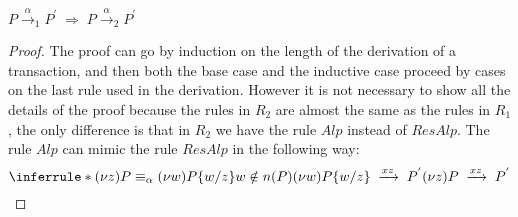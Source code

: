 

\begin{theorem}
  $P\xrightarrow{\alpha}_{1}P^{'}\; \Rightarrow\; P\xrightarrow{\alpha}_{2}P^{'}$
  \begin{proof}
    The proof can go by induction on the length of the derivation of a transaction, and then both the base case and the inductive case proceed by cases on the last rule used in the derivation. However it is not necessary to show all the details of the proof because the rules in $R_{2}$ are almost the same as the rules in $R_{1}$, the only difference is that in $R_{2}$ we have the rule $Alp$ instead of $ResAlp$. The rule $Alp$ can mimic the rule $ResAlp$ in the following way:
	\[
	  \inferrule *{
	      (\nu z)P\equiv_{\alpha} (\nu w)P\{w/z\}
	    \\
	      w\notin n(P)
	    \\
	      (\nu w)P\{w/z\}\;
		\xrightarrow{xz}\;
		  P^{'}
	  }{
	    (\nu z)P\; 
	      \xrightarrow{xz}\;
		P^{'}
	  }
	\]
  \end{proof}
\end{theorem}


